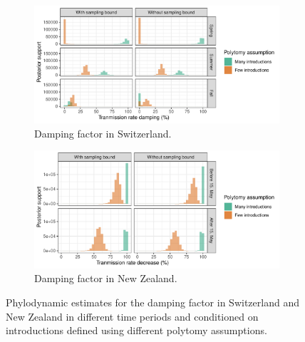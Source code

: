 \documentclass[9pt,twoside,lineno]{pnas-new}
\begin{document}
\begin{figure}[h!]
\centering
\begin{subfigure}[b]{0.75\textwidth}
\includegraphics[width=\linewidth]{figures/CHE_contact_tracing_factor.pdf}
\caption{Damping factor in Switzerland.}
\end{subfigure}
\begin{subfigure}[b]{0.75\textwidth}
\includegraphics[width=\linewidth]{figures/NZL_contact_tracing_factor.pdf}
\caption{Damping factor in New Zealand.}
\end{subfigure}
\caption{Phylodynamic estimates for the damping factor in Switzerland and New Zealand in different time periods and conditioned on introductions defined using different polytomy assumptions.}  
\label{fig:DampingFactorResults}
\end{figure}
\newpage
\end{document}
